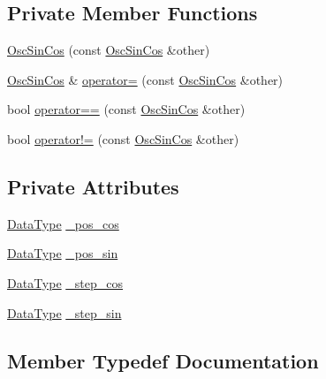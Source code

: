 \subsection*{Private Member Functions}
\begin{DoxyCompactItemize}
\item 
\hyperlink{classffft_1_1OscSinCos_a55142abe630264728cdec4eac8cdc932}{Osc\+Sin\+Cos} (const \hyperlink{classffft_1_1OscSinCos}{Osc\+Sin\+Cos} \&other)
\item 
\hyperlink{classffft_1_1OscSinCos}{Osc\+Sin\+Cos} \& \hyperlink{classffft_1_1OscSinCos_aa1205e8382acd3b8ccfc5bd4dc1a6ac6}{operator=} (const \hyperlink{classffft_1_1OscSinCos}{Osc\+Sin\+Cos} \&other)
\item 
bool \hyperlink{classffft_1_1OscSinCos_a77055dcda40cc256ec6f481fe9779bee}{operator==} (const \hyperlink{classffft_1_1OscSinCos}{Osc\+Sin\+Cos} \&other)
\item 
bool \hyperlink{classffft_1_1OscSinCos_a39334cbb48e55afe3db6a3d36069f052}{operator!=} (const \hyperlink{classffft_1_1OscSinCos}{Osc\+Sin\+Cos} \&other)
\end{DoxyCompactItemize}
\subsection*{Private Attributes}
\begin{DoxyCompactItemize}
\item 
\hyperlink{classffft_1_1OscSinCos_af91237051e92ce0af7aaf38b1826244d}{Data\+Type} \hyperlink{classffft_1_1OscSinCos_a27b849cf4cd82b159f969c9de39197d5}{\+\_\+pos\+\_\+cos}
\item 
\hyperlink{classffft_1_1OscSinCos_af91237051e92ce0af7aaf38b1826244d}{Data\+Type} \hyperlink{classffft_1_1OscSinCos_afddb969706b1b473229bf433d308b670}{\+\_\+pos\+\_\+sin}
\item 
\hyperlink{classffft_1_1OscSinCos_af91237051e92ce0af7aaf38b1826244d}{Data\+Type} \hyperlink{classffft_1_1OscSinCos_ad0bdc750147d730559311933ac124ab2}{\+\_\+step\+\_\+cos}
\item 
\hyperlink{classffft_1_1OscSinCos_af91237051e92ce0af7aaf38b1826244d}{Data\+Type} \hyperlink{classffft_1_1OscSinCos_a1a55c352898b66ee77bff85e116fdce0}{\+\_\+step\+\_\+sin}
\end{DoxyCompactItemize}


\subsection{Member Typedef Documentation}
